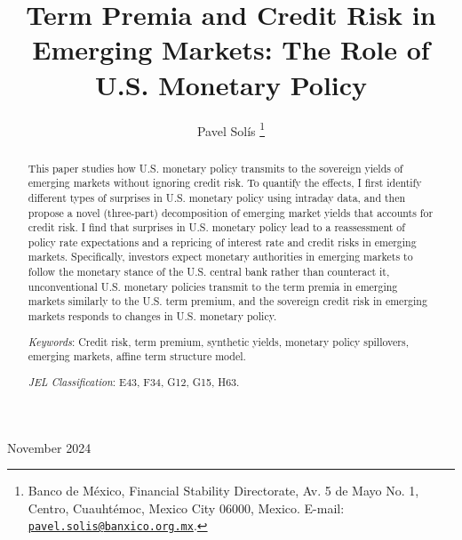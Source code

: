 \documentclass[a4paper, 12pt]{article}
\begin{document}
\title{Term Premia and Credit Risk in Emerging Markets: The Role of U.S. Monetary Policy}
\author{Pavel Solís \hspace{-0.8em} \thanks{\protect\linespread{1}\protect\selectfont Banco de México, Financial Stability Directorate, Av. 5 de Mayo No. 1, Centro, Cuauhtémoc, Mexico City 06000, Mexico. E-mail: \href{mailto:pavel.solis@banxico.org.mx}{\texttt{pavel.solis@banxico.org.mx}}.}	}
\date{}
\maketitle	\vspace{-4ex}
\begin{center}
	November 2024
\end{center}

\begin{abstract}
	This paper studies how U.S. monetary policy transmits to the sovereign yields of emerging markets without ignoring credit risk. To quantify the effects, I first identify different types of surprises in U.S. monetary policy using intraday data, and then propose a novel (three-part) decomposition of emerging market yields that accounts for credit risk. I find that surprises in U.S. monetary policy lead to a reassessment of policy rate expectations and a repricing of interest rate and credit risks in emerging markets. Specifically, investors expect monetary authorities in emerging markets to follow the monetary stance of the U.S. central bank rather than counteract it, unconventional U.S. monetary policies transmit to the term premia in emerging markets similarly to the U.S. term premium, and the sovereign credit risk in emerging markets responds to changes in U.S. monetary policy. 
	
	\vspace{0.5cm}
	\noindent \textit{Keywords}: Credit risk, term premium, synthetic yields, monetary policy spillovers, emerging markets, affine term structure model.
	
	\vspace{0.2cm}
	\noindent \textit{JEL Classification}: E43, F34, G12, G15, H63.
	
	\vfill
	
	\pagebreak
\end{abstract}
\end{document}
